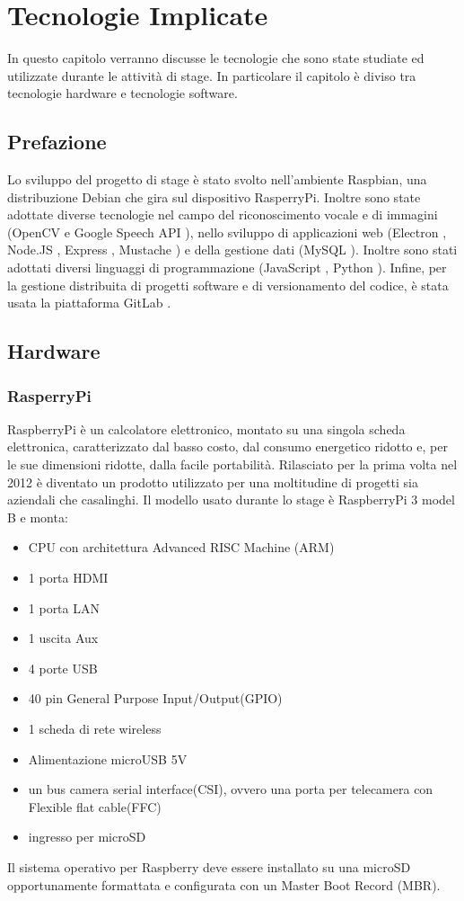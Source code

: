 \chapter{Tecnologie Implicate}\label{capitolo2}
In questo capitolo verranno discusse le tecnologie che sono state studiate ed utilizzate durante le attivit\`a di stage.
In particolare il capitolo \`e diviso tra tecnologie hardware e tecnologie software.

\section{Prefazione}
Lo sviluppo del progetto di stage \`e stato svolto nell'ambiente Raspbian\cite{Raspbian},
una distribuzione Debian\cite{Debian} che gira sul dispositivo RasperryPi\cite{Raspberry}.
Inoltre sono state adottate diverse tecnologie nel campo del riconoscimento vocale e di
immagini (OpenCV \cite{OpenCV-website} e Google Speech API \cite{GoogleSTT-website}),
nello sviluppo di applicazioni web (Electron \cite{Electron-website}, Node.JS \cite{Node.JS-website},
Express \cite{Express-website}, Mustache \cite{Mustache}) e della gestione dati (MySQL \cite{MySQL}).
Inoltre sono stati adottati diversi linguaggi di programmazione (JavaScript \cite{JavaScript}, Python \cite{Python}).
Infine, per la gestione distribuita di progetti software e di versionamento del codice, \`e
stata usata la piattaforma GitLab \cite{git-website}.

\section{Hardware}
\subsection{RasperryPi}
RaspberryPi \`e un calcolatore elettronico, montato su una singola scheda elettronica,
caratterizzato dal basso costo, dal consumo energetico ridotto e, per le sue
dimensioni ridotte, dalla facile portabilit\`a.
Rilasciato per la prima volta nel 2012 \`e diventato un prodotto utilizzato per una moltitudine
di progetti sia aziendali che casalinghi.
Il modello usato durante lo stage \`e RaspberryPi 3 model B e monta:
\begin{itemize}
\item CPU con architettura Advanced RISC Machine (ARM)
\item 1 porta HDMI
\item 1 porta LAN
\item 1 uscita Aux
\item 4 porte USB
\item 40 pin General Purpose Input/Output(GPIO)
\item 1 scheda di rete wireless
\item Alimentazione microUSB 5V
\item un bus camera serial interface(CSI), ovvero una porta per telecamera con Flexible flat cable(FFC)
\item ingresso per microSD
\end{itemize}
Il sistema operativo per Raspberry deve essere installato su una microSD opportunamente formattata
e configurata con un Master Boot Record (MBR).

